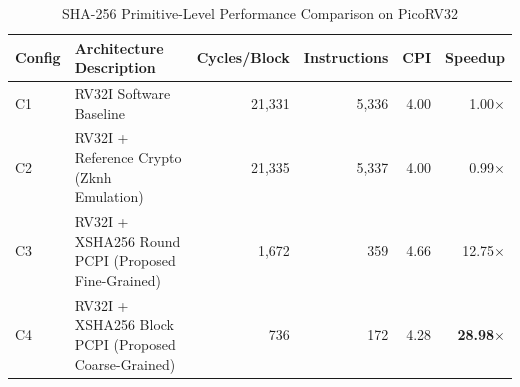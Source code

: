 \begin{table}[htbp]
\centering
\caption{SHA-256 Primitive-Level Performance Comparison on PicoRV32}
\label{tab:primitive_benchmark}
\begin{tabular}{llrrrr}
\hline
\textbf{Config} & \textbf{Architecture Description} & \textbf{Cycles/Block} & \textbf{Instructions} & \textbf{CPI} & \textbf{Speedup} \\
\hline
C1 & RV32I Software Baseline & 21,331 & 5,336 & 4.00 & 1.00$\times$ \\
C2 & RV32I + Reference Crypto (Zknh Emulation) & 21,335 & 5,337 & 4.00 & 0.99$\times$ \\
C3 & RV32I + XSHA256 Round PCPI (Proposed Fine-Grained) & 1,672 & 359 & 4.66 & 12.75$\times$ \\
C4 & RV32I + XSHA256 Block PCPI (Proposed Coarse-Grained) & 736 & 172 & 4.28 & \textbf{28.98$\times$} \\
\hline
\end{tabular}
\end{table}
